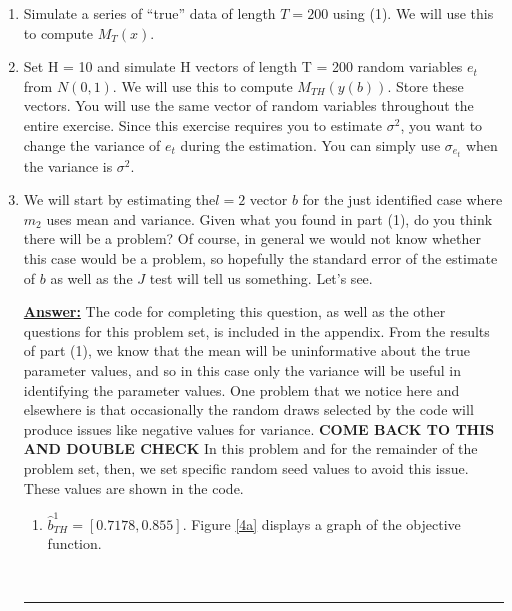 \documentclass{article} %
\DeclareMathOperator*{\E}{\mathbb{E}} %
\theoremstyle{definition}
\newenvironment{solution}[1][Answer]{\begin{singlespace}\underline{\textbf{#1:}}\quad }{\ \rule{0.3em}{0.3em}\end{singlespace}} %
\begin{document}
\begin{enumerate}
\begin{solution}
			Both the variance and the first order correlation are informative for estimating $ b $. This is because we can estimate the true parameters given the two moments as follows
			\begin{align*}
				\rho_0 = \frac{ \E[(x_t - \E[x_t]) (x_{t-1} - \E[x_{t-1}]) ] }{ 	\E[(x_t - \E[x_t])^2]  } && \sigma^2 =  \E[(x_t - \E[x_t])^2] -  \frac{ \E[(x_t - \E[x_t]) (x_{t-1} - \E[x_{t-1}]) ] }{ 	\E[(x_t - \E[x_t])^2]  }
			\end{align*}
		\end{solution}
		\item Simulate a series of “true” data of length $ T = 200 $ using (1). We will use this to compute
		$ M_T (x) $.
		
		\item Set H = 10 and simulate H vectors of length T = 200 random variables $ e_t $ from $ N(0, 1) $. We will use this to compute $ M_{TH}(y(b)) $. Store these vectors. You will use the same vector of random variables throughout the entire exercise. Since this exercise requires you to estimate $ \sigma^2 $, you want to change the variance of $ e_t $ during the estimation. You can simply use $ \sigma_{e_t} $ when the variance is $ \sigma^2 $.
		\item We will start by estimating the$l = 2$ vector $b$ for the just identified case where $m_{2}$ uses mean and variance. Given what you found in part (1), do you think there will be a problem? Of course, in general we would not know whether this case would be a problem, so hopefully the standard error of the estimate of $b$ as well as the $J$ test will tell us something. Let’s see.
		\begin{solution}
		The code for completing this question, as well as the other questions for this problem set, is included in the appendix. From the results of part (1), we know that the mean will be uninformative about the true parameter values, and so in this case only the variance will be useful in identifying the parameter values. One problem that we notice here and elsewhere is that occasionally the random draws selected by the code will produce issues like negative values for variance. \textbf{COME BACK TO THIS AND DOUBLE CHECK} In this problem and for the remainder of the problem set, then, we set specific random seed values to avoid this issue. These values are shown in the code.
		\begin{enumerate}[label=(\alph*)]
			\item $\hat{b}_{TH}^{1}=[0.7178,0.855]$. Figure \ref{4a} displays a graph of the objective function.

\end{enumerate}
\end{solution}
\end{enumerate}
\end{document}
